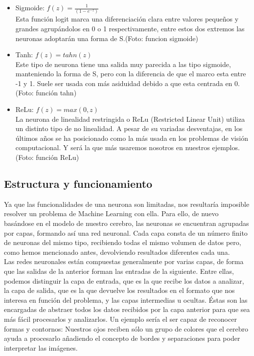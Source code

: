 \begin{itemize}
    \item Sigmoide: $f(z) = \frac{1}{(1-e^{-z})}$\\
    Esta función logit marca una diferenciación clara entre valores pequeños y grandes agrupándolos en 0 o 1 respectivamente, entre estos dos extremos las neuronas adoptarán una forma de S.(Foto: funcion sigmoide)
    \item Tanh: $f(z)= tahn(z)$\\
    Este tipo de neurona tiene una salida muy parecida a las tipo sigmoide, manteniendo la forma de S, pero con la diferencia de que el marco esta entre -1 y 1. Suele ser usada con más asiduidad debido a que esta centrada en 0.(Foto: función tahn)
    \item ReLu: $f(z) = max(0,z)$\\
    La neurona de linealidad restringida o ReLu (Restricted Linear Unit) utiliza un distinto tipo de no linealidad. A pesar de su variadas desventajas, en los últimos años se ha posicionado como la más usada en los problemas de visión computacional. Y será la que más usaremos nosotros en nuestros ejemplos. (Foto: función ReLu)
\end{itemize}

\subsection{Estructura y funcionamiento}
Ya que las funcionalidades de una neurona son limitadas, nos resultaría imposible resolver un problema de Machine Learning con ella. Para ello, de nuevo basándose en el modelo de nuestro cerebro, las neuronas se encuentran agrupadas por capas, formando así una red neuronal. Cada capa consta de un número finito de neuronas del mismo tipo, recibiendo todas el mismo volumen de datos pero, como hemos mencionado antes, devolviendo resultados diferentes cada una. \\

Las redes neuronales están compuestas generalmente por varias capas, de forma que las salidas de la anterior forman las entradas de la siguiente. Entre ellas, podemos distinguir la capa de entrada, que es la que recibe los datos a analizar, la capa de salida, que es la que devuelve los resultados en el formato que nos interesa en función del problema, y las capas intermedias u ocultas. Éstas son las encargadas de abstraer todos los datos recibidos por la capa anterior para que sea más fácil procesarlos y analizarlos. Un ejemplo sería el ser capaz de reconocer formas y contornos: Nuestros ojos reciben sólo un grupo de colores que el cerebro ayuda a procesarlo añadiendo el concepto de bordes y separaciones para poder interpretar las imágenes. \\

